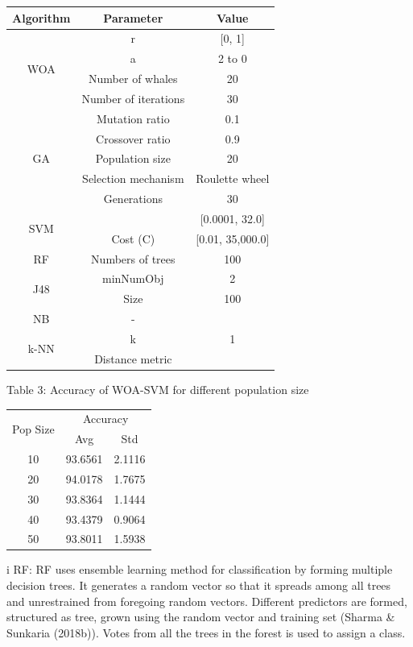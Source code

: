 \documentclass{article}
\begin{document}
\begin{tabular}{|c|c|c|}\hline
Algorithm & Parameter & Value \\ \hline
\multirow{4}{*}{WOA} & r & [0, 1] \\ \cline{2-3}
  & a & 2 to 0 \\ \cline{2-3}
  & Number of whales & 20 \\ \cline{2-3}
  & Number of iterations & 30 \\ \hline
\multirow{5}{*}{GA} & Mutation ratio & 0.1 \\ \cline{2-3}
  & Crossover ratio & 0.9 \\ \cline{2-3}
  & Population size & 20 \\ \cline{2-3}
  & Selection mechanism & Roulette wheel \\ \cline{2-3}
  & Generations & 30 \\ \hline
\multirow{2}{*}{SVM} &  & [0.0001, 32.0] \\ \cline{2-3}
  & Cost (C) & [0.01, 35,000.0] \\ \hline
RF & Numbers of trees & 100 \\ \hline
\multirow{2}{*}{J48} & minNumObj & 2 \\ \cline{2-3}
  & Size & 100 \\ \hline
NB & - &  \\ \hline
\multirow{2}{*}{k-NN} & k & 1 \\ \cline{2-3}
  & Distance metric &  \\ \hline
\end{tabular}
Table 3: Accuracy of WOA-SVM for different population size


\begin{tabular}{|c|c|c|}\hline
\multirow{2}{*}{Pop Size} & \multicolumn{2}{|c|}{Accuracy} \\ \cline{2-3}
  & Avg & Std \\ \hline
10 & 93.6561 & 2.1116 \\ \hline
20 & 94.0178 & 1.7675 \\ \hline
30 & 93.8364 & 1.1444 \\ \hline
40 & 93.4379 & 0.9064 \\ \hline
50 & 93.8011 & 1.5938 \\ \hline
\end{tabular}
i RF: RF uses ensemble learning method for classification by forming multiple decision trees. It generates a random vector so that it spreads among all trees and unrestrained from foregoing random vectors. Different predictors are formed, structured as tree, grown using the random vector and training set (Sharma & Sunkaria (2018b)). Votes from all the trees in the forest is used to assign a class.
\end{document}
